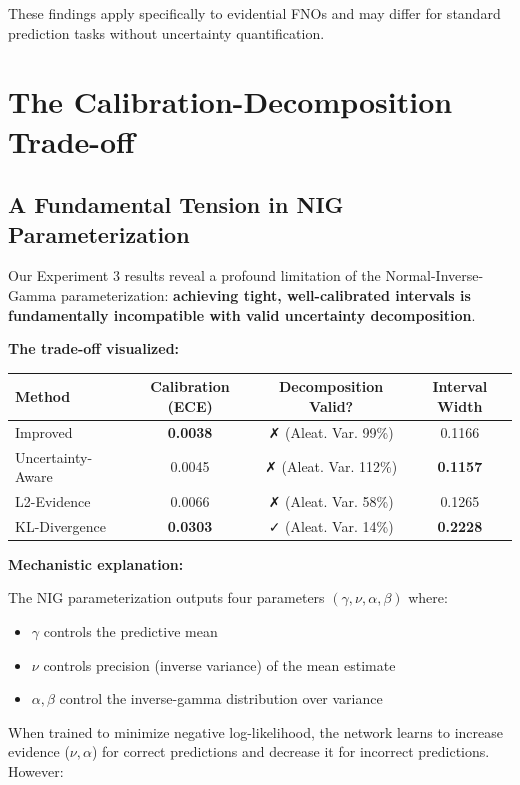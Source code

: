 These findings apply specifically to evidential FNOs and may differ for standard prediction tasks without uncertainty quantification.

\section{The Calibration-Decomposition Trade-off}

\subsection{A Fundamental Tension in NIG Parameterization}

Our Experiment 3 results reveal a profound limitation of the Normal-Inverse-Gamma parameterization: \textbf{achieving tight, well-calibrated intervals is fundamentally incompatible with valid uncertainty decomposition}.

\textbf{The trade-off visualized:}

\begin{center}
\begin{tabular}{lccc}
\toprule
\textbf{Method} & \textbf{Calibration (ECE)} & \textbf{Decomposition Valid?} & \textbf{Interval Width} \\
\midrule
Improved & \textbf{0.0038} & ✗ (Aleat. Var. 99\%) & 0.1166 \\
Uncertainty-Aware & 0.0045 & ✗ (Aleat. Var. 112\%) & \textbf{0.1157} \\
L2-Evidence & 0.0066 & ✗ (Aleat. Var. 58\%) & 0.1265 \\
KL-Divergence & \textbf{0.0303} & ✓ (Aleat. Var. 14\%) & \textbf{0.2228} \\
\bottomrule
\end{tabular}
\end{center}

\textbf{Mechanistic explanation:}

The NIG parameterization outputs four parameters $(\gamma, \nu, \alpha, \beta)$ where:
\begin{itemize}
\item $\gamma$ controls the predictive mean
\item $\nu$ controls precision (inverse variance) of the mean estimate
\item $\alpha, \beta$ control the inverse-gamma distribution over variance
\end{itemize}

When trained to minimize negative log-likelihood, the network learns to increase evidence ($\nu, \alpha$) for correct predictions and decrease it for incorrect predictions. However:

